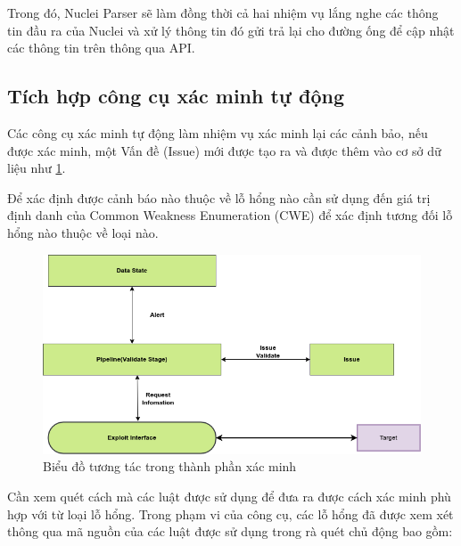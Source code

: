 \documentclass[./../main.tex]{subfiles}
\begin{document}
Trong đó, Nuclei Parser sẽ làm đồng thời cả hai nhiệm vụ
lắng nghe các thông tin đầu ra của Nuclei và xử lý thông tin đó gửi trả
lại cho đường ống để cập nhật các thông tin trên thông qua API.

\subsection{Tích hợp công cụ xác minh tự động}

Các công cụ xác minh tự động làm nhiệm vụ xác minh lại các cảnh bảo,
nếu được xác minh, một Vấn đề (Issue) mới được tạo ra và được thêm vào cơ sở dữ
liệu như \ref{fig:validate_stage}.

Để xác định được cảnh báo nào thuộc về lỗ hổng nào cần sử dụng đến
giá trị định danh của Common Weakness Enumeration (CWE) để xác định
tương đối lỗ hổng nào thuộc về loại nào.

\begin{figure}[ht!]
	\includegraphics[width=\linewidth]{./images/validate_stage.png}
	\caption{Biểu đồ tương tác trong thành phần xác minh}
	\label{fig:validate_stage}
\end{figure}

Cần xem quét cách mà các luật được sử dụng để đưa ra được cách xác minh phù
hợp với từ loại lỗ hổng. Trong phạm vi của công cụ, các lỗ hổng đã được
xem xét thông qua mã nguồn của các luật được sử dụng trong rà quét chủ động
bao gồm:
\end{document}
